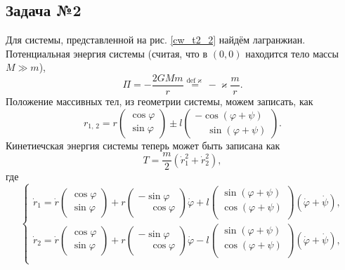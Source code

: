 \subsection*{Задача №2}

Для системы, представленной на рис. \ref{cw_t2_2} найдём лагранжиан. Потенциальная энергия системы (считая, что в $(0,0)$ находится тело массы $M \gg m$),
\begin{equation*}
    \Pi = - \frac{2GMm}{r} \overset{\mathrm{def} \varkappa}{=} - \varkappa \frac{m}{r} .
\end{equation*}
Положение массивных тел, из геометрии системы, можем записать, как
\begin{equation*}
    r_{1,\,2} = r \begin{pmatrix}
        \cos \varphi \\
        \sin \varphi 
    \end{pmatrix} 
    \pm l \begin{pmatrix}
        - \cos (\varphi + \psi) \\
        \phantom{-} \sin (\varphi + \psi)
    \end{pmatrix}.
\end{equation*}
Кинетиечская энергия системы теперь может быть записана как
\begin{equation*}
    T = \frac{m}{2} \left(
        \dot{r}^2_1 + \dot{r}^2_2
    \right),
\end{equation*}
где
\begin{equation}
\left\{\begin{aligned}
    \dot{r}_1 = \dot{r} \begin{pmatrix}
        \cos \varphi \\
        \sin \varphi  
    \end{pmatrix} + r \begin{pmatrix}
        - \sin \varphi \\
        \phantom{-}  \cos \varphi
    \end{pmatrix}
    \dot{\varphi} + 
    l \begin{pmatrix}
        \sin (\varphi + \psi) \\
        \cos (\varphi + \psi) \\
    \end{pmatrix} (\dot{\varphi} + \dot{\psi}), \\
    \dot{r}_2 = \dot{r} \begin{pmatrix}
        \cos \varphi \\
        \sin \varphi  
    \end{pmatrix} + r \begin{pmatrix}
        - \sin \varphi \\
        \phantom{-}  \cos \varphi
    \end{pmatrix}
    \dot{\varphi} - 
    l \begin{pmatrix}
        \sin (\varphi + \psi) \\
        \cos (\varphi + \psi) \\
    \end{pmatrix} (\dot{\varphi} + \dot{\psi}), \\
\end{aligned}\right.
\end{equation}
